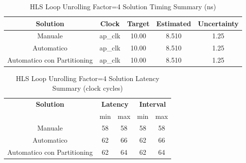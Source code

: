 



\begin{table}[H]
    \centering
    \begin{tabular}{|c|c|c|c|c|}
        \hline
        \textbf{Solution} & \textbf{Clock} & \textbf{Target} & \textbf{Estimated} & \textbf{Uncertainty} \\
        \hline
        Manuale & ap\_clk & 10.00 & 8.510 & 1.25 \\
        \hline
        Automatico & ap\_clk & 10.00 & 8.510 & 1.25 \\
        \hline
        Automatico con Partitioning & ap\_clk & 10.00 & 8.510 & 1.25 \\
        \hline
    \end{tabular}
    \caption{HLS Loop Unrolling Factor=4 Solution Timing Summary (ns)}
    \label{tab:hls-loop-unrolling-factor4-solution-timing-summary}
\end{table}

\begin{table}[H]
    \centering
    \begin{tabular}{|c|c|c|c|c|}
        \hline
        \multicolumn{1}{|c|}{\textbf{Solution}} & \multicolumn{2}{|c|}{\textbf{Latency}} & \multicolumn{2}{|c|}{\textbf{Interval}} \\
        & min & max & min & max \\
        \hline
        Manuale & 58 & 58 & 58 & 58 \\
        \hline
        Automatico & 62 & 66 & 62 & 66 \\
        \hline
        Automatico con Partitioning & 62 & 64 & 62 & 64 \\
        \hline
    \end{tabular}
    \caption{HLS Loop Unrolling Factor=4 Solution Latency Summary (clock cycles)}
    \label{tab:hls-loop-unrolling-factor4-solution-latency-summary}
\end{table}


